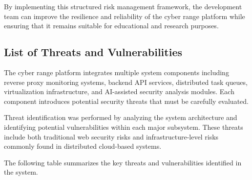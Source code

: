 By implementing this structured risk management framework, the development team can improve the resilience and reliability of the cyber range platform while ensuring that it remains suitable for educational and research purposes.

\subsection{List of Threats and Vulnerabilities}
The cyber range platform integrates multiple system components including reverse proxy monitoring systems, backend API services, distributed task queues, virtualization infrastructure, and AI-assisted security analysis modules. Each component introduces potential security threats that must be carefully evaluated.

Threat identification was performed by analyzing the system architecture and identifying potential vulnerabilities within each major subsystem. These threats include both traditional web security risks and infrastructure-level risks commonly found in distributed cloud-based systems.

The following table summarizes the key threats and vulnerabilities identified in the system.

\vspace{\baselineskip}

